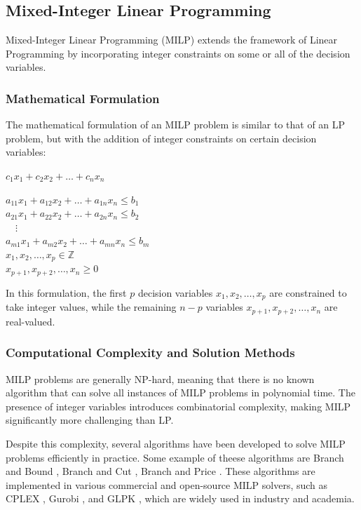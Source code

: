 \subsection{Mixed-Integer Linear Programming}
Mixed-Integer Linear Programming (MILP) extends the framework of Linear Programming by incorporating integer constraints on some or all of the decision variables. 

\subsubsection{Mathematical Formulation}
The mathematical formulation of an MILP problem is similar to that of an LP problem, but with the addition of integer constraints on certain decision variables:


\begin{center}
    $c_1x_1 + c_2x_2 + \dots + c_nx_n $
\end{center}
\begin{center}
    $  a_{11}x_1 + a_{12}x_2 + \dots + a_{1n}x_n \leq b_1 $ \\
    $ a_{21}x_1 + a_{22}x_2 + \dots + a_{2n}x_n \leq b_2 $ \\
    $ \quad \vdots $ \\
    $ a_{m1}x_1 + a_{m2}x_2 + \dots + a_{mn}x_n \leq b_m $ \\
    $ x_1, x_2, \dots, x_p \in \mathbb{Z} $ \\
    $ x_{p+1}, x_{p+2}, \dots, x_n \geq 0 $
\end{center}



In this formulation, the first $ p $ decision variables $ x_1, x_2, \dots, x_p $ are constrained to take integer values, while the remaining $ n-p $ variables $ x_{p+1}, x_{p+2}, \dots, x_n $ are real-valued. 

\subsubsection{Computational Complexity and Solution Methods}
MILP problems are generally NP-hard, meaning that there is no known algorithm that can solve all instances of MILP problems in polynomial time. The presence of integer variables introduces combinatorial complexity, making MILP significantly more challenging than LP.

Despite this complexity, several algorithms have been developed to solve MILP problems efficiently in practice. Some example of theese algorithms are
Branch and Bound \cite{land1960branch}, Branch and Cut \cite{padberg1991branch}, Branch and Price \cite{barnhart1998branch}.
These algorithms are implemented in various commercial and open-source MILP solvers, such as CPLEX \cite{studio2016ibm}, Gurobi \cite{gurobi2021gurobi}, and GLPK \cite{makhorin2008glpk}, which are widely used in industry and academia.

